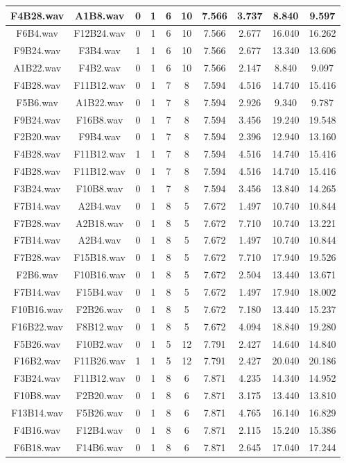 \documentclass[11pt,a4paper]{book}
\begin{document}
\begin{longtable}[c]{|c|c|c|c|c|c|c|c|c|c|}
F4B28.wav&A1B8.wav&0&1&6&10&7.566&3.737&8.840&9.597\\ \hline
F6B4.wav&F12B24.wav&0&1&6&10&7.566&2.677&16.040&16.262\\ \hline
F9B24.wav&F3B4.wav&1&1&6&10&7.566&2.677&13.340&13.606\\ \hline
A1B22.wav&F4B2.wav&0&1&6&10&7.566&2.147&8.840&9.097\\ \hline
F4B28.wav&F11B12.wav&0&1&7&8&7.594&4.516&14.740&15.416\\ \hline
F5B6.wav&A1B22.wav&0&1&7&8&7.594&2.926&9.340&9.787\\ \hline
F9B24.wav&F16B8.wav&0&1&7&8&7.594&3.456&19.240&19.548\\ \hline
F2B20.wav&F9B4.wav&0&1&7&8&7.594&2.396&12.940&13.160\\ \hline
F4B28.wav&F11B12.wav&1&1&7&8&7.594&4.516&14.740&15.416\\ \hline
F4B28.wav&F11B12.wav&0&1&7&8&7.594&4.516&14.740&15.416\\ \hline
F3B24.wav&F10B8.wav&0&1&7&8&7.594&3.456&13.840&14.265\\ \hline
F7B14.wav&A2B4.wav&0&1&8&5&7.672&1.497&10.740&10.844\\ \hline
F7B28.wav&A2B18.wav&0&1&8&5&7.672&7.710&10.740&13.221\\ \hline
F7B14.wav&A2B4.wav&0&1&8&5&7.672&1.497&10.740&10.844\\ \hline
F7B28.wav&F15B18.wav&0&1&8&5&7.672&7.710&17.940&19.526\\ \hline
F2B6.wav&F10B16.wav&0&1&8&5&7.672&2.504&13.440&13.671\\ \hline
F7B14.wav&F15B4.wav&0&1&8&5&7.672&1.497&17.940&18.002\\ \hline
F10B16.wav&F2B26.wav&0&1&8&5&7.672&7.180&13.440&15.237\\ \hline
F16B22.wav&F8B12.wav&0&1&8&5&7.672&4.094&18.840&19.280\\ \hline
F5B26.wav&F10B2.wav&0&1&5&12&7.791&2.427&14.640&14.840\\ \hline
F16B2.wav&F11B26.wav&1&1&5&12&7.791&2.427&20.040&20.186\\ \hline
F3B24.wav&F11B12.wav&0&1&8&6&7.871&4.235&14.340&14.952\\ \hline
F10B8.wav&F2B20.wav&0&1&8&6&7.871&3.175&13.440&13.810\\ \hline
F13B14.wav&F5B26.wav&0&1&8&6&7.871&4.765&16.140&16.829\\ \hline
F4B16.wav&F12B4.wav&0&1&8&6&7.871&2.115&15.240&15.386\\ \hline
F6B18.wav&F14B6.wav&0&1&8&6&7.871&2.645&17.040&17.244\\ \hline

\end{longtable}
\end{document}

